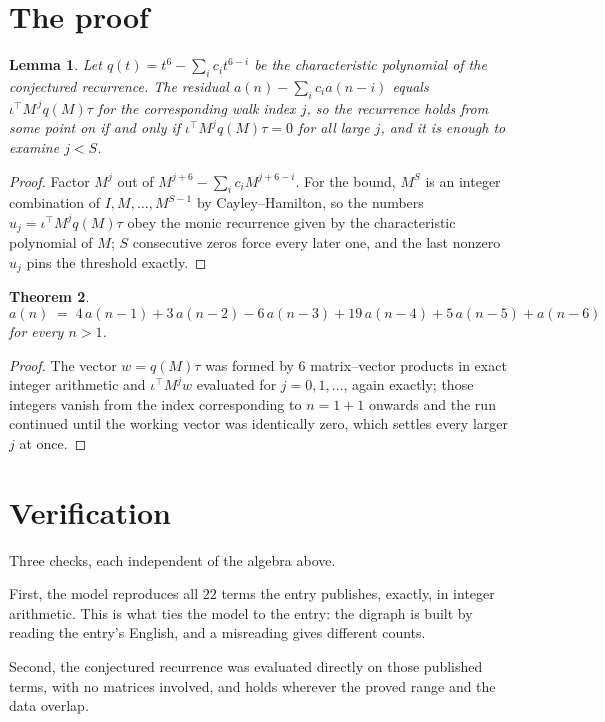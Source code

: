 \documentclass[11pt,a4paper]{article}
\theoremstyle{plain}
\newtheorem{theorem}{Theorem}
\newtheorem{lemma}[theorem]{Lemma}
\theoremstyle{definition}
\begin{document}
\section{The proof}

\begin{lemma}\label{lem:crit}
Let $q(t)=t^{6}-\sum_i c_it^{6-i}$ be the characteristic polynomial of the
conjectured recurrence. The residual $a(n)-\sum_ic_ia(n-i)$ equals
$\iota^{\!\top}M^{\,j}q(M)\tau$ for the corresponding walk index $j$, so the recurrence
holds from some point on if and only if $\iota^{\!\top}M^{j}q(M)\tau=0$ for all large $j$,
and it is enough to examine $j<S$.
\end{lemma}

\begin{proof}
Factor $M^{j}$ out of $M^{j+6}-\sum_ic_iM^{j+6-i}$. For the bound, $M^{S}$
is an integer combination of $I,M,\dots,M^{S-1}$ by Cayley--Hamilton, so the numbers
$u_j=\iota^{\!\top}M^{j}q(M)\tau$ obey the monic recurrence given by the characteristic
polynomial of $M$; $S$ consecutive zeros force every later one, and the last nonzero $u_j$
pins the threshold exactly.
\end{proof}

\begin{theorem}
\[
a(n)\;=\;4\,a(n-1) + 3\,a(n-2) - 6\,a(n-3) + 19\,a(n-4) + 5\,a(n-5) + a(n-6)
\]
for every $n>1$.
\end{theorem}

\begin{proof}
The vector $w=q(M)\tau$ was formed by $6$ matrix--vector products in exact integer
arithmetic and $\iota^{\!\top}M^{j}w$ evaluated for $j=0,1,\dots$, again exactly; those
integers vanish from the index corresponding to $n=1+1$ onwards and the run continued
until the working vector was identically zero, which settles every larger $j$ at once.
\end{proof}

\section{Verification}

Three checks, each independent of the algebra above.

First, the model reproduces all $22$ terms the entry publishes, exactly, in integer
arithmetic. This is what ties the model to the entry: the digraph is built by reading the
entry's English, and a misreading gives different counts.

Second, the conjectured recurrence was evaluated directly on those published terms, with no
matrices involved, and holds wherever the proved range and the data overlap.
\end{document}
